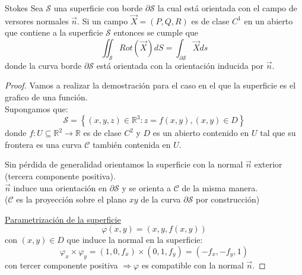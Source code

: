\documentclass{report}
\newcommand\reals{\mathds{R}}
\begin{document}
\begin{teobox}{Stokes}
	Sea $\mathcal{S}$ una superficie con borde $\partial{\mathcal{S}}$ la cual está orientada con el campo de versores normales $\vec{n}$. Si un campo $\vec{X}= (P,Q,R)$ es de clase $C^1$ en un abierto que contiene a la superficie $\mathcal{S}$ entonces se cumple que
	\begin{equation}
		\iint_{\mathcal{S}}{Rot(\vec{X})dS} =
		\int_{\partial{\mathcal{S}}}{\vec{X}ds}
		\label{eq:teo_stokes}
	\end{equation}
	donde la curva borde $\partial{\mathcal{S}}$ está orientada con la orientación inducida por $\vec{n}$.
\end{teobox}
\begin{proof}
	Vamos a realizar la demostración para el caso en el que la superficie es el grafico de una función. \\
	Supongamos que:
	\[
		\mathcal{S} = \left\{ (x,y,z)\in \reals^3 : z = f(x,y), (x,y) \in D\right\}
	\]
	donde $f: U \subseteq \reals^2 \rightarrow \reals$ es de clase $C^2$ y $D$ es un abierto contenido en $U$ tal que su frontera es una curva $\mathcal{C}$ también contenida en $U$.

	Sin pérdida de generalidad orientamos la superficie con la normal $\vec{n}$ exterior (tercera componente positiva). \\
	$\vec{n}$ induce una orientación en $\partial \mathcal{S}$ y se orienta a $\mathcal{C}$ de la misma manera. \\
	($\mathcal{C}$ es la proyección sobre el plano $xy$ de la curva $\partial\mathcal{S}$ por construcción)

	\underline{Parametrización de la superficie} \\
	\[
		\varphi (x,y) = (x, y, f(x,y))
	\]
	con $(x,y) \in D$ que induce la normal en la superficie:
	\[
		\varphi_x \times \varphi_y = (1, 0, f_x)\times (0, 1, f_y) = (-f_x, -f_y, 1)
	\]
	con tercer componente positiva $\Rightarrow \varphi$ es compatible con la normal $\vec{n}$.


\end{proof}
\end{document}

